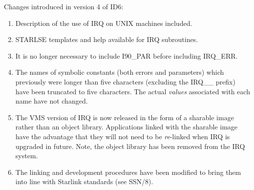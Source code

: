 Changes introduced in version 4 of ID6:
\begin {enumerate}
\item Description of the use of IRQ on UNIX machines included.
\item STARLSE templates and help available for IRQ subroutines.
\item It is no longer necessary to include I90\_PAR before including
IRQ\_ERR.
\item The names of symbolic constants (both errors and parameters) which previously 
were longer than five characters (excluding the IRQ\_\_ prefix) have been
truncated to five characters. The actual {\em values} associated with each name 
have not changed.
\item The VMS version of IRQ is now released in the form of a sharable image 
rather than an object library. Applications linked with the sharable image have 
the advantage that they will not need to be {\em re}-linked when IRQ is upgraded 
in future. Note, the object library has been removed from the IRQ system.
\item The linking and development procedures have been modified to bring them 
into line with Starlink standards (see SSN/8).

\end {enumerate}


